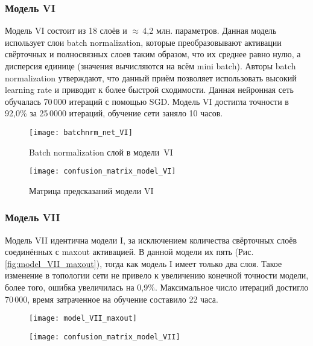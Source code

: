 \subsubsection{Модель VI}
Модель VI состоит из 18 слоёв и $\approx$\,4,2 млн. параметров. Данная модель использует слои batch normalization, 
которые преобразовывают активации свёрточных и полносвязных слоев таким образом, что их среднее равно нулю, а
дисперсия единице (значения вычисляются на всём mini batch). Авторы batch normalization \cite{DBLP:journals/corr/IoffeS15}
утверждают, что данный приём позволяет использовать высокий learning rate и приводит к более быстрой сходимости.
Данная нейронная сеть обучалась 70\,000 итераций с помощью SGD. Модель VI достигла точности в 92,0\% за 25\,0000 итераций, 
обучение сети заняло 10 часов.
\begin{figure}[H]
    \centering
    \texttt{[image: batchnrm\_net\_VI]}
    \caption{Batch normalization слой в модели~VI}
    \label{fig:model_VI_bnrm}
\end{figure}

\begin{figure}[H]
    \centering
    \texttt{[image: confusion\_matrix\_model\_VI]}
    \vspace*{-1cm}
    \caption{Матрица предсказаний модели VI}
    \label{fig:confusion_matrix_model_VI}
\end{figure}

\subsubsection{Модель VII}
Модель VII идентична модели I, за исключением количества свёрточных слоёв соединённых с maxout активацией. В данной модели их пять
(Рис. \ref{fig:model_VII_maxout}), тогда как модель I имеет только два слоя. Такое изменение в топологии сети не привело к 
увеличению конечной точности модели, более того, ошибка увеличилась на 0,9\%. Максимальное число итераций достигло 70\,000,
время затраченное на обучение составило 22 часа.

\begin{figure}[H]
\centering
\begin{minipage}{.5\textwidth}
  \centering
  \vspace*{0.7cm}
  \texttt{[image: model\_VII\_maxout]}
  \vspace*{-0.4cm}
  \label{fig:model_VII_maxout}
\end{minipage}%
\begin{minipage}{.5\textwidth}
  \centering
  \texttt{[image: confusion\_matrix\_model\_VII]}
  \vspace*{-1.7cm}
  \label{fig:confusion_matrix_model_VII}
\end{minipage}
\end{figure}

